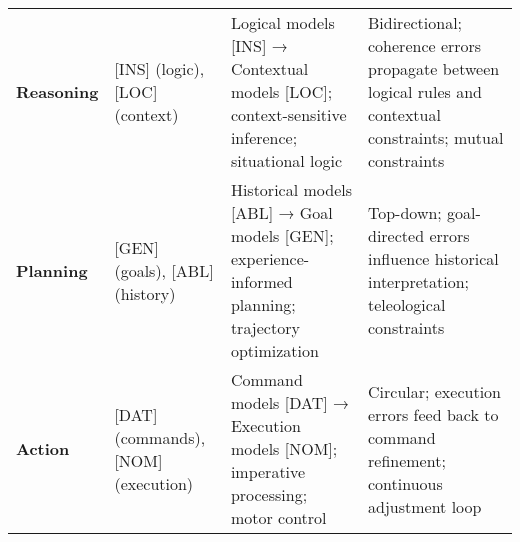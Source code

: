 \begin{longtable}[]{@{}llll@{}}
\begin{minipage}[t]{0.11\columnwidth}
\textbf{Reasoning}\strut
\end{minipage} & \begin{minipage}[t]{0.20\columnwidth}\raggedright
{[}INS{]} (logic), {[}LOC{]} (context)\strut
\end{minipage} & \begin{minipage}[t]{0.30\columnwidth}\raggedright
Logical models {[}INS{]} → Contextual models {[}LOC{]};
context-sensitive inference; situational logic\strut
\end{minipage} & \begin{minipage}[t]{0.27\columnwidth}\raggedright
Bidirectional; coherence errors propagate between logical rules and
contextual constraints; mutual constraints\strut
\end{minipage}\tabularnewline
\begin{minipage}[t]{0.11\columnwidth}\raggedright
\textbf{Planning}\strut
\end{minipage} & \begin{minipage}[t]{0.20\columnwidth}\raggedright
{[}GEN{]} (goals), {[}ABL{]} (history)\strut
\end{minipage} & \begin{minipage}[t]{0.30\columnwidth}\raggedright
Historical models {[}ABL{]} → Goal models {[}GEN{]}; experience-informed
planning; trajectory optimization\strut
\end{minipage} & \begin{minipage}[t]{0.27\columnwidth}\raggedright
Top-down; goal-directed errors influence historical interpretation;
teleological constraints\strut
\end{minipage}\tabularnewline
\begin{minipage}[t]{0.11\columnwidth}\raggedright
\textbf{Action}\strut
\end{minipage} & \begin{minipage}[t]{0.20\columnwidth}\raggedright
{[}DAT{]} (commands), {[}NOM{]} (execution)\strut
\end{minipage} & \begin{minipage}[t]{0.30\columnwidth}\raggedright
Command models {[}DAT{]} → Execution models {[}NOM{]}; imperative
processing; motor control\strut
\end{minipage} & \begin{minipage}[t]{0.27\columnwidth}\raggedright
Circular; execution errors feed back to command refinement; continuous
adjustment loop\strut
\end{minipage}\tabularnewline
\bottomrule
\end{longtable}

